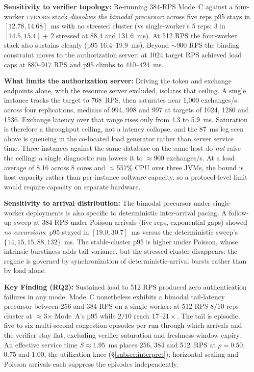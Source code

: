 \documentclass[conference]{IEEEtran}
\begin{document}
\textbf{Sensitivity to verifier topology:} Re-running 384-RPS Mode~C against a four-worker \textsc{uvicorn} stack \emph{dissolves the bimodal precursor}: across five reps p95 stays in $[12.78, 14.68]$~ms with no stressed cluster (vs single-worker's 5 reps: 3 in $[14.5, 15.4]$ + 2 stressed at 88.4 and 131.6~ms). At 512 RPS the four-worker stack also sustains cleanly (p95 16.4--19.9~ms). Beyond $\sim$900 RPS the binding constraint moves to the authorization server: at 1024 target RPS achieved load caps at 880--917 RPS and p95 climbs to 410--424~ms.

\textbf{What limits the authorization server:} Driving the token and exchange endpoints alone, with the resource server excluded, isolates that ceiling. A single instance tracks the target to 768~RPS, then saturates near 1{,}000 exchanges/s: across four replications, medians of 994, 998 and 997 at targets of 1024, 1280 and 1536. Exchange latency over that range rises only from 4.3 to 5.9~ms. Saturation is therefore a throughput ceiling, not a latency collapse, and the 87~ms leg seen above is queueing in the co-located load generator rather than server service time. Three instances against the same database on the same host do \emph{not} raise the ceiling: a single diagnostic run lowers it to $\approx$900 exchanges/s. At a load average of 8.16 across 8 cores and $\approx$557\% CPU over three JVMs, the bound is host capacity rather than per-instance software capacity, so a protocol-level limit would require capacity on separate hardware.

\textbf{Sensitivity to arrival distribution:} The bimodal precursor under single-worker deployments is also specific to deterministic inter-arrival pacing. A follow-up sweep at 384 RPS under Poisson arrivals (five reps, exponential gaps) showed \emph{no excursions}: p95 stayed in $[19.0, 30.7]$~ms versus the deterministic sweep's $\{14, 15, 15, 88, 132\}$~ms. The stable-cluster p95 is higher under Poisson, whose intrinsic burstiness adds tail variance, but the stressed cluster disappears: the regime is governed by synchronization of deterministic-arrival bursts rather than by load alone.

\textbf{Key Finding (RQ2):} Sustained load to 512 RPS produced zero authentication failures in any mode. Mode~C nonetheless exhibits a bimodal tail-latency precursor between 256 and 384 RPS on a single worker: at 512 RPS $8/10$ reps cluster at $\approx$3$\times$ Mode~A's p95 while $2/10$ reach $17$--$21\times$. The tail is episodic, five to six multi-second congestion episodes per run through which arrivals and the verifier stay flat, excluding verifier saturation and freshness-window expiry. An effective service time $S \approx 1.95$~ms places 256, 384 and 512~RPS at $\rho = 0.50$, 0.75 and 1.00, the utilization knee (\S\ref{subsec:interpret}); horizontal scaling and Poisson arrivals each suppress the episodes independently.
\end{document}
